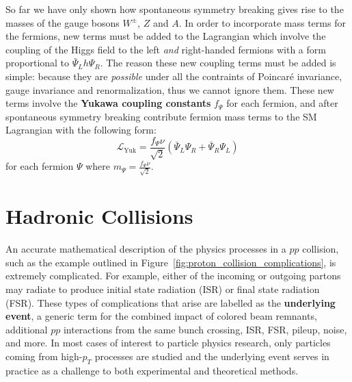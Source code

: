 So far we have only shown how spontaneous symmetry breaking gives rise to the masses of the gauge bosons $W^\pm$, $Z$ and $A$.
In order to incorporate mass terms for the fermions, new terms must be added to the Lagrangian which involve the coupling of the Higgs field to the left \textit{and} right-handed fermions with a form proportional to $\bar{\Psi}_L h \Psi_R$.
The reason these new coupling terms must be added is simple: because they are \textit{possible} under all the contraints of Poincar\'{e} invariance, gauge invariance and renormalization, thus we cannot ignore them.
These new terms involve the \textbf{Yukawa coupling constants} $f_\Psi$ for each fermion, and after spontaneous symmetry breaking contribute fermion mass terms to the SM Lagrangian with the following form:
\begin{equation}
\mathcal{L}_{\mathrm{Yuk}} = \frac{f_\Psi \nu}{\sqrt{2}} \left( \bar{\Psi}_L \Psi_R + \bar{\Psi}_R \Psi_L \right)
\end{equation}
for each fermion $\Psi$ where $m_\Psi = \frac{f_\Psi \nu}{\sqrt{2}}$.

\section{Hadronic Collisions}
An accurate mathematical description of the physics processes in a $pp$ collision, such as the example outlined in Figure~\ref{fig:proton_collision_complications}, is extremely complicated.
For example, either of the incoming or outgoing partons may radiate to produce initial state radiation (ISR) or final state radiation (FSR).
These types of complications that arise are labelled as the \textbf{underlying event}, a generic term for the combined impact of colored beam remnants, additional $pp$ interactions from the same bunch crossing, ISR, FSR, pileup, noise, and more.
In most cases of interest to particle physics research, only particles coming from high-$p_T$ processes are studied and the underlying event serves in practice as a challenge to both experimental and theoretical methods.

